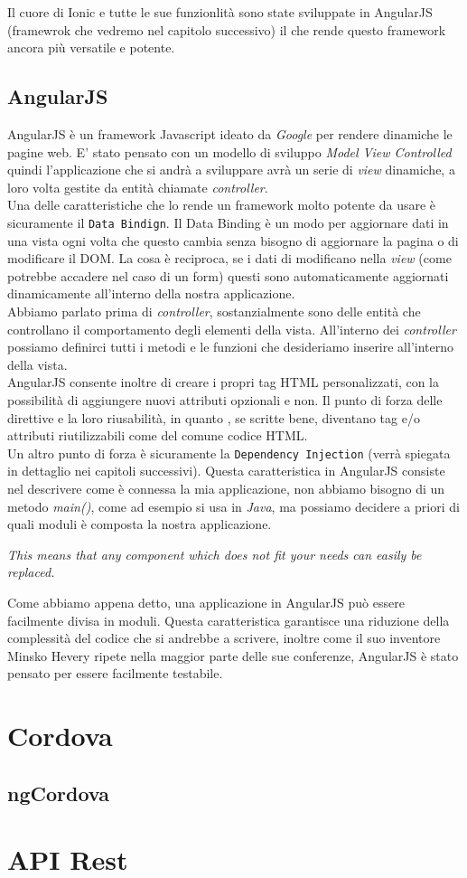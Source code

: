Il cuore di Ionic e tutte le sue funzionlità sono state sviluppate in AngularJS (framewrok che vedremo nel capitolo successivo) il che rende questo framework ancora più versatile e potente.
\subsection{AngularJS}
AngularJS è un framework Javascript ideato da \emph{Google} per rendere dinamiche le pagine web. E' stato pensato con un modello di sviluppo \emph{Model View Controlled} quindi l'applicazione che si andrà a sviluppare avrà un serie di \emph{view} dinamiche, a loro volta gestite da entità chiamate \emph{controller}.\\
Una delle caratteristiche che lo rende un framework molto potente da usare è sicuramente il \texttt{Data Bindign}. Il Data Binding è un modo per aggiornare dati in una vista ogni volta che questo cambia senza bisogno di aggiornare la pagina o di modificare il DOM. La cosa è reciproca, se i dati di modificano nella \emph{view} (come potrebbe accadere nel caso di un form) questi sono automaticamente aggiornati dinamicamente all'interno della nostra applicazione.\\
Abbiamo parlato prima di \emph{controller}, sostanzialmente sono delle entità che controllano il comportamento degli elementi della vista. All'interno dei \emph{controller} possiamo definirci tutti i metodi e le funzioni che desideriamo inserire all'interno della vista.\\
AngularJS consente inoltre di creare i propri tag HTML personalizzati, con la possibilità di aggiungere nuovi attributi opzionali e non. Il punto di forza delle direttive e la loro riusabilità, in quanto , se scritte bene, diventano tag e/o attributi riutilizzabili come del comune codice HTML.\\
Un altro punto di forza è sicuramente la \texttt{Dependency Injection} (verrà spiegata in dettaglio nei capitoli successivi). Questa caratteristica in AngularJS consiste nel descrivere come è connessa la mia applicazione, non abbiamo bisogno di un metodo \emph{main()}, come ad esempio si usa in \emph{Java}, ma possiamo decidere a priori di quali moduli è composta la nostra applicazione.
\begin{center}
\emph{This means that any component which does not fit your needs can easily be replaced.} 
\end{center}
Come abbiamo appena detto, una applicazione in AngularJS può essere facilmente divisa in moduli. Questa caratteristica garantisce una riduzione della complessità del codice che si andrebbe a scrivere, inoltre come il suo inventore Minsko Hevery ripete nella maggior parte delle sue conferenze, AngularJS è stato pensato per essere facilmente testabile.

\section{Cordova}
\subsection{ngCordova}
\section{API Rest}
